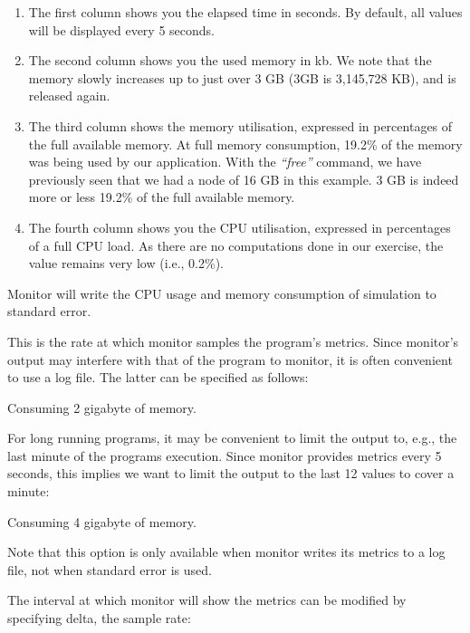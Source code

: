 \begin{enumerate}
\item  The first column shows you the elapsed time in seconds. By default, all
  values will be displayed every 5 seconds.
\item  The second column shows you the used memory in kb. We note that the
  memory slowly increases up to just over 3 GB (3GB is 3,145,728 KB), and is released again.
\item  The third column shows the memory utilisation, expressed in percentages
  of the full available memory.  At full memory consumption, 19.2\% of the
  memory was being used by our application. With the \emph{``free''} command,
  we have previously seen that we had a node of 16 GB in this example. 3 GB is
  indeed more or less 19.2\% of the full available memory.
\item  The fourth column shows you the CPU utilisation, expressed in
  percentages of a full CPU load. As there are no computations done in our
  exercise, the value remains very low (i.e., 0.2\%).
\end{enumerate}

Monitor will write the CPU usage and memory consumption of simulation to standard error.

This is the rate at which monitor samples the program's metrics. Since
monitor's output may interfere with that of the program to monitor, it is often
convenient to use a log file. The latter can be specified as follows:

\begin{prompt}
Consuming 2 gigabyte of memory.
\end{prompt}

For long running programs, it may be convenient to limit the output to, e.g.,
the last minute of the programs execution. Since monitor provides metrics every
5 seconds, this implies we want to limit the output to the last 12 values to
cover a minute:

\begin{prompt}
Consuming 4 gigabyte of memory.
\end{prompt}

Note that this option is only available when monitor writes its metrics to a
log file, not when standard error is used.

The interval at which monitor will show the metrics can be modified by
specifying delta, the sample rate:

